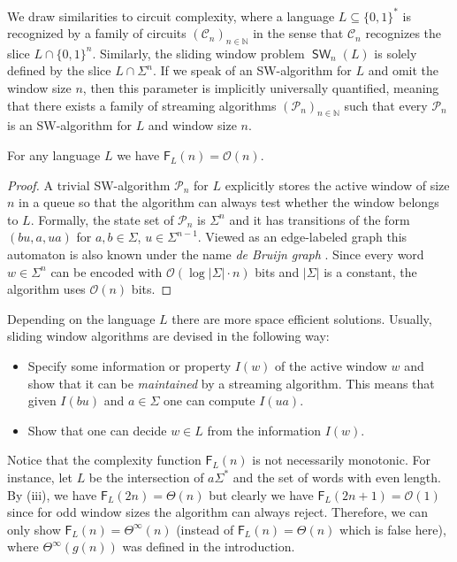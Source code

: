 \documentclass{article}\usepackage[a4paper,margin=20mm]{geometry}
\newcommand{\N}{\mathbb{N}}
\renewcommand{\O}{\mathcal{O}}
\renewcommand{\P}{\mathcal{P}}
\newcommand{\F}{\mathsf{F}}
\DeclareMathOperator{\SW}{\mathsf{SW}}
\newcommand{\Thetainf}{\Theta^{\scriptscriptstyle{\infty}}}
\begin{document}
We draw similarities to circuit complexity, where a language $L \subseteq \{0,1\}^*$ is recognized by a family of circuits
$(\mathcal{C}_n)_{n \in \N}$ in the sense that $\mathcal{C}_n$ recognizes the slice $L \cap \{0,1\}^n$.
Similarly, the sliding window problem $\SW_n(L)$ is solely defined by the slice
$L \cap \Sigma^n$.
If we speak of an SW-algorithm for $L$ and omit the window size $n$,
then this parameter is implicitly universally quantified,
meaning that there exists a family of streaming algorithms $(\P_n)_{n \in \N}$
such that every $\P_n$ is an SW-algorithm for $L$ and window size $n$.

\begin{lemma}
	For any language $L$ we have $\F_L(n) = \O(n)$.
\end{lemma}

\begin{proof}
	A trivial SW-algorithm $\P_n$ for $L$ explicitly
	stores the active window of size $n$ in a queue
	so that the algorithm can always test whether the window belongs to $L$.
	Formally, the state set of $\P_n$ is $\Sigma^n$ and it has transitions of the form
	$(bu,a,ua)$ for $a,b \in \Sigma$, $u \in \Sigma^{n-1}$.
	Viewed as an edge-labeled graph this automaton is also known
	under the name {\em de Bruijn graph} \cite{deBr46}. 
	Since every word $w \in \Sigma^n$ can be encoded with $\O(\log |\Sigma| \cdot n)$ bits and  $|\Sigma|$ is a constant,
	the algorithm uses $\O(n)$ bits.
\end{proof}

Depending on the language $L$ there are more space efficient solutions.
Usually, sliding window algorithms are devised in the following way:
\begin{itemize}
\item Specify some information or property $I(w)$ of the active window $w$
and show that it can be {\em maintained} by a streaming algorithm.
This means that given $I(bu)$ and $a \in \Sigma$ one can compute $I(ua)$.
\item Show that one can decide $w \in L$ from the information $I(w)$.
\end{itemize}
Notice that the complexity function $\F_L(n)$ is not necessarily monotonic.
For instance, let $L$ be the intersection of $a \Sigma^*$ and the set of words with even length. 
By (iii), we have $\F_L(2n) = \Theta(n)$ but clearly we have $\F_L(2n+1) = \O(1)$
since for odd window sizes the algorithm can always reject.
Therefore, we can only show $\F_L(n) = \Thetainf(n)$ (instead of $\F_L(n) = \Theta(n)$ which is false here),
where $\Thetainf(g(n))$ was defined in the introduction.
\end{document}
